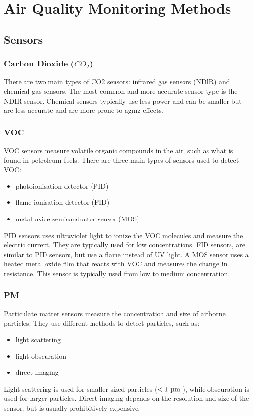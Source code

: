 \section{Air Quality Monitoring Methods}

\subsection{Sensors}
\subsubsection{Carbon Dioxide ($CO_2$)}
There are two main types of CO2 sensors: infrared gas sensors (NDIR) and chemical gas sensors. \cite{disruptive:co2sensor}
The most common and more accurate sensor type is the NDIR sensor. Chemical sensors typically use less power and can be smaller but are less accurate and are more prone to aging effects.

\subsubsection{VOC}
VOC sensors measure volatile organic compounds in the air, such as what is found in petroleum fuels. There are three main types of sensors used to detect VOC\cite{ourpcb:vocsensor}\cite{utmel:vocsensor}:

\begin{itemize}
	\item photoionisation detector (PID)
	\item flame ionisation detector (FID)
	\item metal oxide semiconductor sensor (MOS)
\end{itemize}
PID sensors uses ultraviolet light to ionize the VOC molecules and measure the electric current. They are typically used for low concentrations.
FID sensors, are similar to PID sensors, but use a flame instead of UV light.
A MOS sensor uses a heated metal oxide film that reacts with VOC and measures the change in resistance. This sensor is typically used from low to medium concentration.\cite{ourpcb:vocsensor}\cite{utmel:vocsensor} 




\subsubsection{PM}
Particulate matter sensors measure the concentration and size of airborne particles. They use different methods to detect particles, such as:
\begin{itemize}
	\item light scattering
	\item light obscuration
	\item direct imaging
\end{itemize}
Light scattering is used for smaller sized particles (\(<1 $ \si{\micro\meter} $\)), while obscuration is used for larger particles\cite{thomasnet:particlesensor}. Direct imaging depends on the resolution and size of the sensor, but is usually prohibitively expensive.

